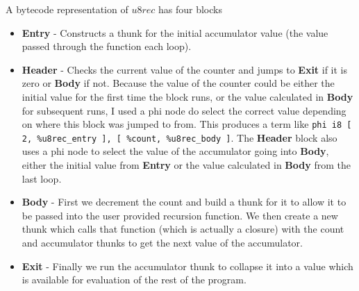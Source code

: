 A bytecode representation of $u8rec$ has four blocks
\begin{itemize}
    \item \textbf{Entry} -
    Constructs a thunk for the initial accumulator value (the value passed through the function each loop).
    \item \textbf{Header} -
    Checks the current value of the counter and jumps to \textbf{Exit} if it is zero or \textbf{Body} if not.
    Because the value of the counter could be either the initial value for the first time the block
    runs, or the value calculated in \textbf{Body} for subsequent runs, I used a phi node do select
    the correct value depending on where this block was jumped to from.
    This produces a term like\newline
    \texttt{phi i8 [ 2, \%u8rec\_entry ], [ \%count, \%u8rec\_body ]}.\newline
    The \textbf{Header} block also uses a phi node to select the value of the accumulator going into
    \textbf{Body}, either the initial value from \textbf{Entry} or the value calculated in \textbf{Body}
    from the last loop.
    \item \textbf{Body} -
    First we decrement the count and build a thunk for it to allow it to be passed into the user provided
    recursion function.
    We then create a new thunk which calls that function (which is actually a closure) with the count
    and accumulator thunks to get the next value of the accumulator.
    \item \textbf{Exit} -
    Finally we run the accumulator thunk to collapse it into a value which is available for evaluation
    of the rest of the program.
\end{itemize}
